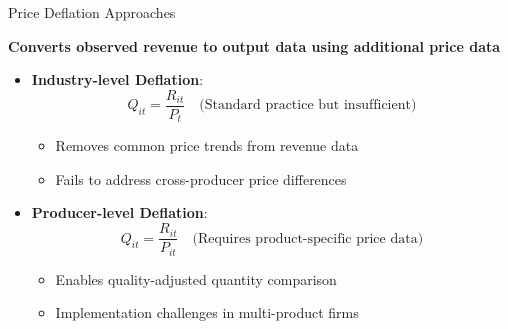 \documentclass[aspectratio=169]{beamer}  %
\begin{document}

\begin{frame}{Price Deflation Approaches}

\textbf {Converts observed revenue to output data using additional price data}
\begin{itemize}
    \item \textbf{Industry-level Deflation}:
    \[
    Q_{it} = \frac{R_{it}}{P_t} \quad \text{(Standard practice but insufficient)}
    \]
    \begin{itemize}
        \item Removes common price trends from revenue data
        \item Fails to address cross-producer price differences
    \end{itemize}
    
    \item \textbf{Producer-level Deflation}:
    \[
    Q_{it} = \frac{R_{it}}{P_{it}} \quad \text{(Requires product-specific price data)}
    \]
    \begin{itemize}
        \item Enables quality-adjusted quantity comparison
        \item Implementation challenges in multi-product firms
    \end{itemize}
\end{itemize}
\end{frame}
\end{document}
